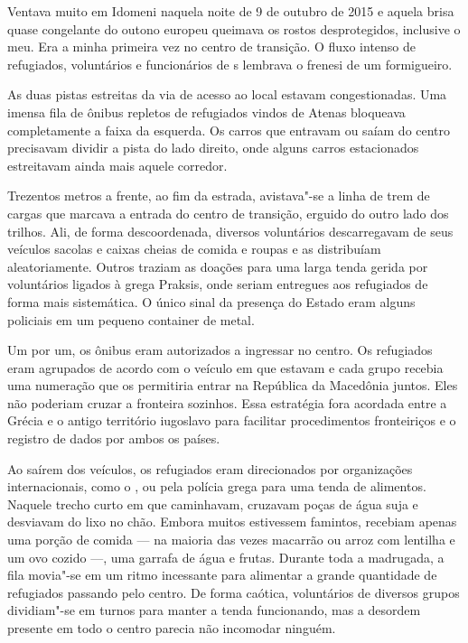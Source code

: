 

Ventava muito em Idomeni naquela noite de 9 de outubro de 2015 e aquela
brisa quase congelante do outono europeu queimava os rostos desprotegidos, inclusive o meu.
% 
% 
%
%
Era a minha primeira vez no centro de transição. O fluxo intenso de refugiados, voluntários e funcionários de
s lembrava o frenesi de um formigueiro.

As duas pistas estreitas da via de acesso ao local estavam
congestionadas. Uma imensa fila de ônibus repletos de refugiados vindos
de Atenas bloqueava completamente a faixa da esquerda. Os carros que
entravam ou saíam do centro precisavam dividir a pista do lado direito,
onde alguns carros estacionados estreitavam ainda mais aquele corredor.

Trezentos metros a frente, ao fim da estrada, avistava"-se a linha de
trem de cargas que marcava a entrada do centro de transição, erguido do
outro lado dos trilhos. Ali, de forma descoordenada, diversos
voluntários descarregavam de seus veículos sacolas e caixas cheias de
comida e roupas e as distribuíam aleatoriamente. Outros traziam as
doações para uma larga tenda gerida por voluntários ligados à  grega
Praksis, onde seriam entregues aos refugiados de forma mais sistemática.
O único sinal da presença do Estado eram alguns policiais em um pequeno
container de metal.

Um por um, os ônibus eram autorizados a ingressar no centro. Os
refugiados eram agrupados de acordo com o veículo em que estavam e cada grupo recebia uma numeração que os
permitiria entrar na República da Macedônia juntos. Eles não poderiam
cruzar a fronteira sozinhos. Essa estratégia fora acordada entre a
Grécia e o antigo território iugoslavo para facilitar procedimentos
fronteiriços e o registro de dados por ambos os países.

Ao saírem dos veículos, os refugiados eram direcionados por organizações
internacionais, como o , ou pela polícia grega para uma tenda de
alimentos. Naquele trecho curto em que caminhavam, cruzavam poças
de água suja e desviavam do lixo no chão. Embora muitos estivessem
famintos, recebiam apenas uma porção de comida --- na maioria das
vezes macarrão ou arroz com lentilha e um ovo cozido \mbox{---,} uma garrafa de
água e frutas. Durante toda a madrugada, a fila movia"-se em um ritmo
incessante para alimentar a grande quantidade de refugiados passando
pelo centro. De forma caótica, voluntários de diversos grupos
dividiam"-se em turnos para manter a tenda funcionando, mas a desordem 
presente em todo o centro parecia não incomodar ninguém.

